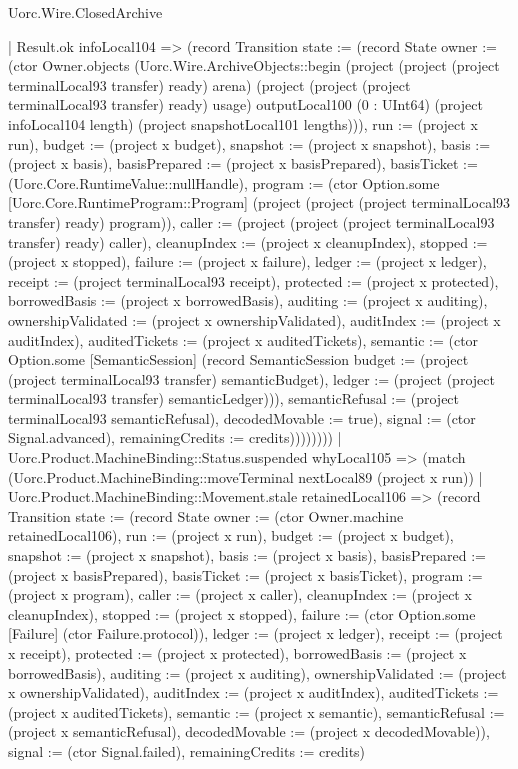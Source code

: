 \begin{lexlean}{Uorc.Wire.ClosedArchive}
\begin{semanticmodule}
{                | Result.ok infoLocal104 => (record Transition {state := (record State {owner := (ctor Owner.objects (Uorc.Wire.ArchiveObjects::begin (project (project (project terminalLocal93 transfer) ready) arena) (project (project (project terminalLocal93 transfer) ready) usage) outputLocal100 (0 : UInt64) (project infoLocal104 length) (project snapshotLocal101 lengths))), run := (project x run), budget := (project x budget), snapshot := (project x snapshot), basis := (project x basis), basisPrepared := (project x basisPrepared), basisTicket := (Uorc.Core.RuntimeValue::nullHandle), program := (ctor Option.some [Uorc.Core.RuntimeProgram::Program] (project (project (project terminalLocal93 transfer) ready) program)), caller := (project (project (project terminalLocal93 transfer) ready) caller), cleanupIndex := (project x cleanupIndex), stopped := (project x stopped), failure := (project x failure), ledger := (project x ledger), receipt := (project terminalLocal93 receipt), protected := (project x protected), borrowedBasis := (project x borrowedBasis), auditing := (project x auditing), ownershipValidated := (project x ownershipValidated), auditIndex := (project x auditIndex), auditedTickets := (project x auditedTickets), semantic := (ctor Option.some [SemanticSession] (record SemanticSession {budget := (project (project terminalLocal93 transfer) semanticBudget), ledger := (project (project terminalLocal93 transfer) semanticLedger)})), semanticRefusal := (project terminalLocal93 semanticRefusal), decodedMovable := true}), signal := (ctor Signal.advanced), remainingCredits := credits}))))))))
    | Uorc.Product.MachineBinding::Status.suspended whyLocal105 => (match (Uorc.Product.MachineBinding::moveTerminal nextLocal89 (project x run))
      | Uorc.Product.MachineBinding::Movement.stale retainedLocal106 => (record Transition {state := (record State {owner := (ctor Owner.machine retainedLocal106), run := (project x run), budget := (project x budget), snapshot := (project x snapshot), basis := (project x basis), basisPrepared := (project x basisPrepared), basisTicket := (project x basisTicket), program := (project x program), caller := (project x caller), cleanupIndex := (project x cleanupIndex), stopped := (project x stopped), failure := (ctor Option.some [Failure] (ctor Failure.protocol)), ledger := (project x ledger), receipt := (project x receipt), protected := (project x protected), borrowedBasis := (project x borrowedBasis), auditing := (project x auditing), ownershipValidated := (project x ownershipValidated), auditIndex := (project x auditIndex), auditedTickets := (project x auditedTickets), semantic := (project x semantic), semanticRefusal := (project x semanticRefusal), decodedMovable := (project x decodedMovable)}), signal := (ctor Signal.failed), remainingCredits := credits})
}
\end{semanticmodule}
\end{lexlean}
